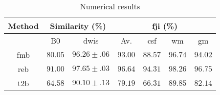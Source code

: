 
\begin{table}[h]
\caption{Numerical results}
\label{table:results}
\begin{center}
\begin{tabular}{c||cc|cccc}
\hline
Method & \multicolumn{2}{c|}{Similarity (\%)} & \multicolumn{4}{c}{\gls*{fji} (\%)} \\
\hline
 & B0 & \glspl*{dwi} & Av. & \gls*{csf} & \gls*{wm} & \gls*{gm} \\
\hline
\gls*{fmb} & $80.05$ & $96.26\pm.06$ & $93.00$ & $88.57$ & $96.74$ & $94.02$ \\
\hline
\gls*{reb} & $91.00$ & $97.65\pm.03$ & $96.64$ & $94.31$ & $98.26$ & $96.75$ \\
\hline
\gls*{t2b} & $64.58$ & $90.10\pm.13$ & $79.19$ & $66.31$ & $89.85$ & $82.14$ \\
\hline
\end{tabular}
\end{center}
\end{table}